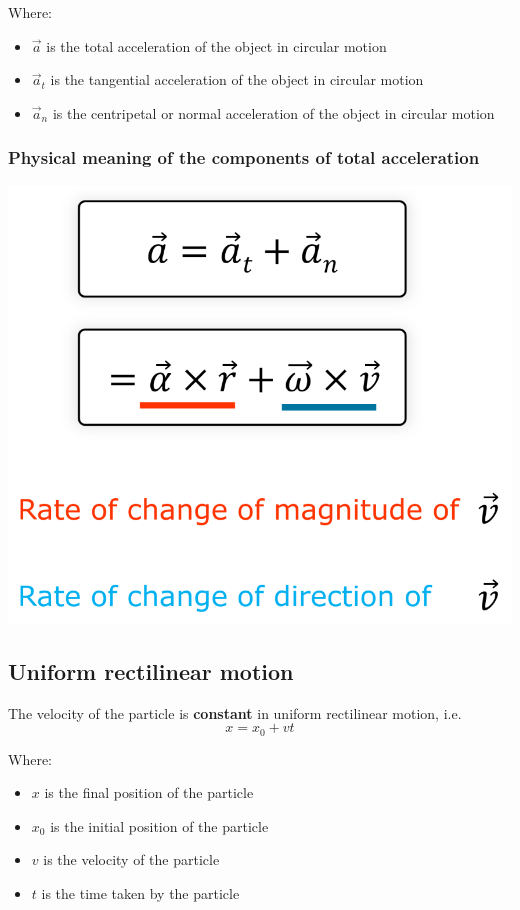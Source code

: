 \documentclass[11pt]{article}
\begin{document}
Where:
\begin{itemize}
\item \(\vec{a}\) is the total acceleration of the object in circular motion
\item \(\vec{a}_t\) is the tangential acceleration of the object in circular motion
\item \(\vec{a}_n\) is the centripetal or normal acceleration of the object in circular motion
\end{itemize}

\subsubsection{Physical meaning of the components of total acceleration}
\label{sec:org6f92c5e}
\begin{center}
\includegraphics[width=.9\linewidth]{./images/physical-meaning-of-components-of-total-acceleration.png}
\end{center}

 \newpage

\subsection{Uniform rectilinear motion}
\label{sec:orgd4a56ae}
The velocity of the particle is \textbf{constant} in uniform rectilinear motion, i.e.
\[x = x_0 + vt\]

Where:
\begin{itemize}
\item \(x\) is the final position of the particle
\item \(x_0\) is the initial position of the particle
\item \(v\) is the velocity of the particle
\item \(t\) is the time taken by the particle
\end{itemize}
\end{document}
